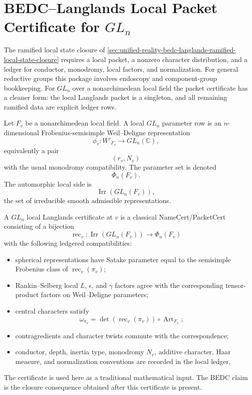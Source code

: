 \section{BEDC--Langlands Local Packet Certificate for $GL_n$}
\label{sec:unified-reality-bedc-langlands-gln-local-packet-cert}

The ramified local state closure of
\autoref{sec:unified-reality-bedc-langlands-ramified-local-state-closure}
requires a local packet, a nonzero character distribution, and a ledger
for conductor, monodromy, local factors, and normalization. For general
reductive groups this package involves endoscopy and component-group
bookkeeping. For $GL_n$ over a nonarchimedean local field the packet
certificate has a cleaner form: the local Langlands packet is a
singleton, and all remaining ramified data are explicit ledger rows.

\begin{definition}
\label{def:unified-reality-gln-local-parameter-row}
Let $F_v$ be a nonarchimedean local field. A local $GL_n$ parameter row
is an $n$-dimensional Frobenius-semisimple Weil--Deligne representation
$$
\phi_v:W'_{F_v}\to GL_n(\mathbb C),
$$
equivalently a pair
$$
(r_v,N_v)
$$
with the usual monodromy compatibility. The parameter set is denoted
$$
\Phi_n(F_v).
$$
The automorphic local side is
$$
\operatorname{Irr}(GL_n(F_v)),
$$
the set of irreducible smooth admissible representations.
\end{definition}

\begin{definition}
\label{def:unified-reality-gln-local-langlands-cert}
A $GL_n$ local Langlands certificate at $v$ is a classical
NameCert/PacketCert consisting of a bijection
$$
\operatorname{rec}_v:
\operatorname{Irr}(GL_n(F_v))
\longrightarrow
\Phi_n(F_v)
$$
with the following ledgered compatibilities:
\begin{itemize}
\item spherical representations have Satake parameter equal to the
semisimple Frobenius class of $\operatorname{rec}_v(\pi_v)$;
\item Rankin--Selberg local $L$, $\epsilon$, and $\gamma$ factors agree
with the corresponding tensor-product factors on Weil--Deligne
parameters;
\item central characters satisfy
$$
\omega_{\pi_v}
=
\det(\operatorname{rec}_v(\pi_v))\circ\operatorname{Art}_{F_v};
$$
\item contragredients and character twists commute with the
correspondence;
\item conductor, depth, inertia type, monodromy $N_v$, additive
character, Haar measure, and normalization conventions are recorded in
the local ledger.
\end{itemize}
The certificate is used here as a traditional mathematical input. The
BEDC claim is the closure consequence obtained after this certificate is
present.
\end{definition}

